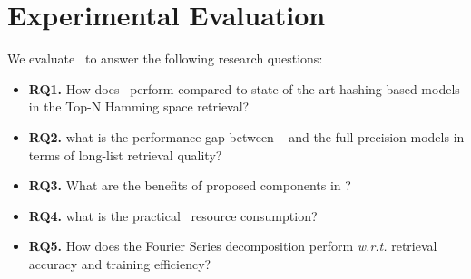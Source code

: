 \section{\textbf{Experimental Evaluation}}
\label{sec:exp}
We evaluate \model~to answer the following research questions:
\begin{itemize}[leftmargin=*]
\item \textbf{RQ1.} How does \model~perform compared to state-of-the-art hashing-based models in the Top-N Hamming space retrieval?

\item \textbf{RQ2.} what is the performance gap between \model~ and the full-precision models in terms of long-list retrieval quality?

\item \textbf{RQ3.} What are the benefits of proposed components in \model?

\item \textbf{RQ4.} what is the practical \model~resource consumption?

\item \textbf{RQ5.} How does the Fourier Series decomposition perform \textit{w.r.t.} retrieval accuracy and training efficiency?

\end{itemize} 

  



















% 





